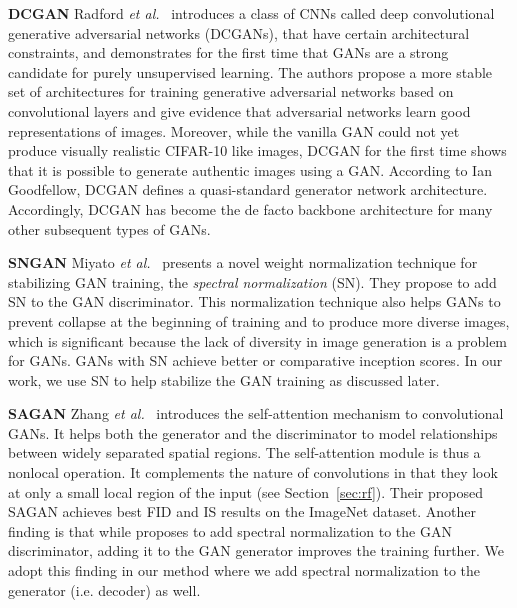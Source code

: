 \documentclass[a4paper,12pt]{report}
\begin{document}
\par \textbf{DCGAN} Radford \textit{et al.}~\cite{DCGAN} introduces a class of CNNs called deep convolutional generative adversarial networks (DCGANs), that have certain architectural constraints, and demonstrates for the first time that GANs are a strong candidate for purely unsupervised learning. The authors propose a more stable set of architectures for training generative adversarial networks based on convolutional layers and give evidence that adversarial networks learn good representations of images. Moreover, while the vanilla GAN could not yet produce visually realistic CIFAR-10 like images, DCGAN for the first time shows that it is possible to generate authentic images using a GAN. According to Ian Goodfellow, DCGAN defines a quasi-standard generator network architecture. Accordingly, DCGAN has become the de facto backbone architecture for many other subsequent types of GANs.

\par \textbf{SNGAN} Miyato \textit{et al.}~\cite{SNGAN} presents a novel weight normalization technique for stabilizing GAN training, the \textit{spectral normalization} (SN). They propose to add SN to the GAN discriminator. This normalization technique also helps GANs to prevent collapse at the beginning of training and to produce more diverse images, which is significant because the lack of diversity in image generation is a problem for GANs. GANs with SN achieve better or comparative inception scores. In our work, we use SN to help stabilize the GAN training as discussed later.

\par \textbf{SAGAN} Zhang \textit{et al.}~\cite{SAGAN} introduces the self-attention mechanism to convolutional GANs. It helps both the generator and the discriminator to model relationships between widely separated spatial regions. The self-attention module is thus a nonlocal operation. It complements the nature of convolutions in that they look at only a small local region of the input (see Section~\ref{sec:rf}). Their proposed SAGAN achieves best FID and IS results on the ImageNet dataset. Another finding is that while \cite{SNGAN} proposes to add spectral normalization to the GAN discriminator, adding it to the GAN generator improves the training further. We adopt this finding in our method where we add spectral normalization to the generator (i.e. decoder) as well. 
\end{document}
